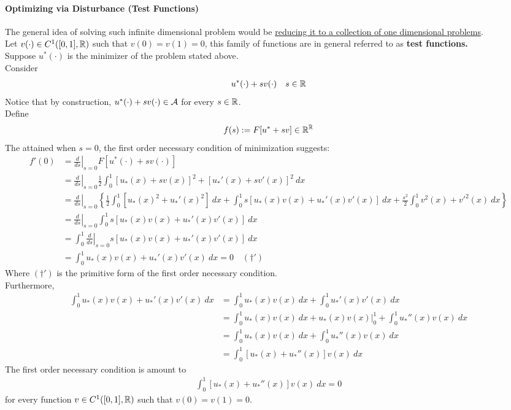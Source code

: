 \documentclass{article}
\begin{document}
	\paragraph{Optimizing via Disturbance (Test Functions)} The general idea of solving such infinite dimensional problem would be \ul{reducing it to a collection of one dimensional problems}. \\
	Let $v(\cdot) \in C^1([0, 1], \mathbb{R})$ such that $v(0) = v(1) = 0$, this family of functions are in general referred to as \textbf{test functions.} \\
	Suppose $u^*(\cdot)$ is the minimizer of the problem stated above. \\
	Consider
	\begin{align}
		u^*(\cdot) + s v(\cdot)\quad s \in \mathbb{R}
	\end{align}
	Notice that by construction, $u^*(\cdot) + s v(\cdot) \in \mathcal{{A}}$ for every $s \in \mathbb{R}$. \\
	Define
	\begin{align}
		f(s) := F[u^* + sv] \in \mathbb{R}^{\mathbb{R}}
	\end{align}
	The attained when $s=0$, the first order necessary condition of minimization suggests:
	\begin{align}
		f'(0) &= \left. \frac{d}{ds} \right|_{s=0} F[u^*(\cdot) + sv(\cdot)] \\
		&= \left. \frac{d}{ds} \right|_{s=0} \frac{1}{2}
		\int_0^1 \left[u_*(x) + sv(x) \right]^2 + \left[u_*'(x) + sv'(x) \right]^2\ dx \\
		&= \left. \frac{d}{ds} \right|_{s=0} \left \{
		\frac{1}{2} \int_0^1 [u_*(x)^2 + u_*'(x)^2]\ dx
		+ \int_0^1 s[u_*(x) v(x) + u_*'(x) v'(x)]\ dx 
		+ \frac{s^2}{2} \int_0^1 v^2(x) + v'^2(x)\ dx
		\right \} \\
		&= \left. \frac{d}{ds} \right|_{s=0} \int_0^1 s[u_*(x) v(x) + u_*'(x) v'(x)]\ dx \\
		&= \int_0^1\left. \frac{d}{ds} \right|_{s=0} s[u_*(x) v(x) + u_*'(x) v'(x)]\ dx \\
		&= \int_0^1 u_*(x) v(x) + u_*'(x) v'(x)\ dx = 0\quad (\dagger')
	\end{align}
	Where $(\dagger')$ is the primitive form of the first order necessary condition. \\
	Furthermore,
	\begin{align}
		\int_0^1 u_*(x) v(x) + u_*'(x) v'(x)\ dx
		&= \int_0^1 u_*(x) v(x)\ dx + \int_0^1 u_*'(x) v'(x)\ dx \\
		&= \int_0^1 u_*(x) v(x)\ dx
		+ \left. u_*(x) v(x) \right|_{0}^1
		+ \int_0^1 u_*''(x) v(x)\ dx \\
		&= \int_0^1 u_*(x) v(x)\ dx
		+ \int_0^1 u_*''(x) v(x)\ dx \\
		&= \int_0^1 [u_*(x) + u_*''(x)] v(x)\ dx
	\end{align}
	The first order necessary condition is amount to
	\begin{align}
		\int_0^1 [u_*(x) + u_*''(x)] v(x)\ dx = 0
	\end{align}
	for every function $v \in C^1([0, 1], \mathbb{R})$ such that $v(0) = v(1) = 0$.
	
\end{document}
